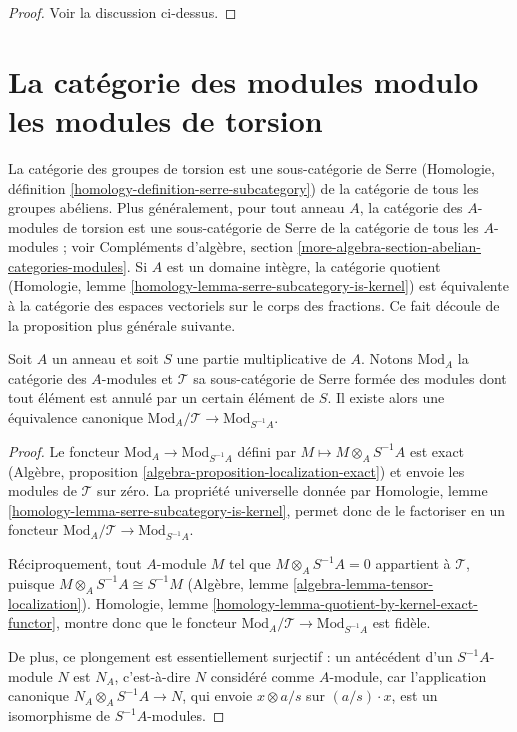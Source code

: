 \begin{proof}
Voir la discussion ci-dessus.
\end{proof}




\section{La catégorie des modules modulo les modules de torsion}
\label{section-serre-quotient-modulo-torsion-modules}

\noindent
La catégorie des groupes de torsion est une sous-catégorie de Serre
(Homologie, définition \ref{homology-definition-serre-subcategory})
de la catégorie de tous les groupes abéliens. Plus généralement, pour tout
anneau $A$, la catégorie des $A$-modules de torsion est une sous-catégorie
de Serre de la catégorie de tous les $A$-modules ; voir Compléments d'algèbre, section
\ref{more-algebra-section-abelian-categories-modules}.
Si $A$ est un domaine intègre, la catégorie quotient
(Homologie, lemme \ref{homology-lemma-serre-subcategory-is-kernel})
est équivalente à la catégorie des espaces vectoriels sur le corps des fractions.
Ce fait découle de la proposition plus générale suivante.

\begin{proposition}
\label{proposition-localization-and-serre-quotients}
Soit $A$ un anneau et soit $S$ une partie multiplicative de $A$.
Notons $\text{Mod}_A$ la catégorie des $A$-modules et $\mathcal{T}$ sa sous-catégorie de Serre formée des modules dont tout élément est annulé
par un certain élément de $S$.
Il existe alors une équivalence canonique
$\text{Mod}_A/\mathcal{T} \rightarrow \text{Mod}_{S^{-1}A}$.
\end{proposition}

\begin{proof}
Le foncteur $\text{Mod}_A \to \text{Mod}_{S^{-1}A}$ défini par $M
\mapsto M \otimes_A S^{-1}A$ est exact (Algèbre, proposition
\ref{algebra-proposition-localization-exact})
et envoie les modules de $\mathcal{T}$ sur zéro.
La propriété universelle donnée par Homologie, lemme \ref{homology-lemma-serre-subcategory-is-kernel},
permet donc de le factoriser en un foncteur
$\text{Mod}_A/\mathcal{T} \to \text{Mod}_{S^{-1}A}$.

\medskip\noindent
Réciproquement, tout $A$-module $M$ tel que
$M \otimes_A S^{-1}A = 0$ appartient à $\mathcal{T}$, puisque
$M \otimes_A S^{-1}A \cong S^{-1} M$
(Algèbre, lemme \ref{algebra-lemma-tensor-localization}).
Homologie, lemme
\ref{homology-lemma-quotient-by-kernel-exact-functor}, montre donc que
le foncteur $\text{Mod}_A/\mathcal{T} \to \text{Mod}_{S^{-1}A}$ est fidèle.

\medskip\noindent
De plus, ce plongement est essentiellement surjectif : un antécédent d'un
$S^{-1}A$-module $N$ est $N_A$, c'est-à-dire $N$ considéré comme $A$-module,
car l'application canonique $N_A \otimes_A S^{-1}A \to N$, qui envoie
$x \otimes a/s$ sur $(a/s) \cdot x$, est un isomorphisme de $S^{-1}A$-modules.
\end{proof}


